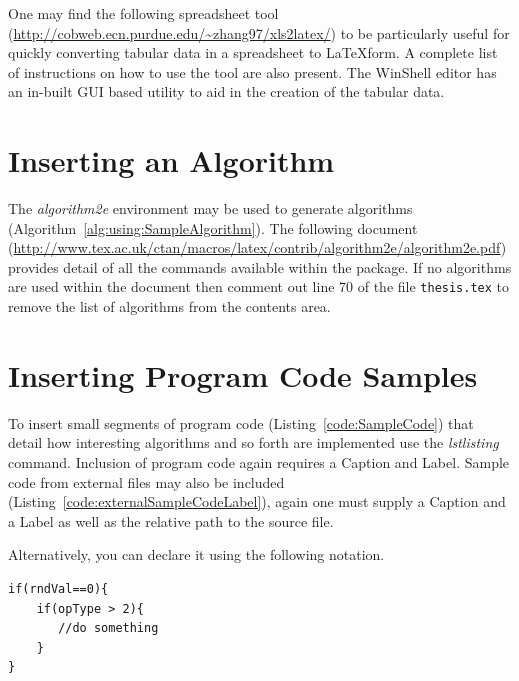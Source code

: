 One may find the following spreadsheet tool (\url{http://cobweb.ecn.purdue.edu/~zhang97/xls2latex/}) to be particularly useful for quickly converting tabular data in a spreadsheet to \LaTeX \space form. A complete list of instructions on how to use the tool are also present. The WinShell editor has an in-built GUI based utility to aid in the creation of the tabular data.

\section{Inserting an Algorithm}

The \emph{algorithm2e} environment may be used to generate algorithms (Algorithm~\ref{alg:using:SampleAlgorithm}). The following document (\url{http://www.tex.ac.uk/ctan/macros/latex/contrib/algorithm2e/algorithm2e.pdf}) provides detail of all the commands available within the package. If no algorithms are used within the document then comment out line 70 of the file {\tt thesis.tex} to remove the list of algorithms from the contents area.


\begin{algorithm}
{}
\caption{A Sample Algorithm} \label{alg:using:SampleAlgorithm}
\end{algorithm}


\section{Inserting Program Code Samples}

To insert small segments of program code (Listing~\ref{code:SampleCode}) that detail how interesting algorithms and so forth are implemented use the \emph{lstlisting} command. Inclusion of program code again requires a Caption and Label. Sample code from external files may also be included (Listing~\ref{code:externalSampleCodeLabel}), again one must supply a Caption and a Label as well as the relative path to the source file.



Alternatively, you can declare it using the following notation.

\begin{lstlisting}[caption=Sample Program Code Listing, label=code:SampleCode]
if(rndVal==0){
    if(opType > 2){
       //do something
    }
}
\end{lstlisting}


